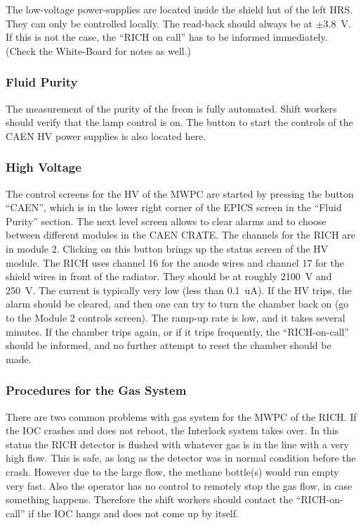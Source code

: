{The low-voltage power-supplies are located inside the shield hut of the 
left HRS. They can only be controlled locally. 
The read-back should always
be at $\pm$3.8~V. If this is not the case, the 
``RICH on call'' has to be informed immediately.
(Check the White-Board for notes as well.)

\subsubsection{Fluid Purity}

The measurement of the purity of the freon is fully automated.
Shift workers should verify that the lamp control is on.
The button to start the controls of the CAEN HV power supplies 
is also located here.

\subsubsection{High Voltage}

The control screens for the HV of the MWPC
are started by pressing the button ``CAEN'', which is 
in the lower right corner of the EPICS screen
in the ``Fluid Purity'' section. 
The next level screen allows to clear alarms and to choose between
different modules in the CAEN CRATE. The channels for the RICH are in
module 2. Clicking on this button brings up the status screen of the 
HV module. The RICH uses channel 16 for the anode wires and channel
17 for the shield wires in front of the radiator. They should be at
roughly 2100~V and 250~V. The current is typically very low (less
than 0.1~uA). If the HV trips, the alarm should be cleared,
and then one can try to turn the chamber back on (go to the 
Module 2 controls screen). The ramp-up rate is low, and it takes
several minutes. If the chamber trips again, or if it trips frequently, 
the ``RICH-on-call''
should be informed, and no further attempt to reset the chamber should
be made.

\subsubsection{Procedures for the Gas System}
\label{sec:rich_measures}

There are two common problems with gas system for the 
MWPC of the RICH. If the IOC crashes and does not reboot,
the Interlock system takes over. In this status the 
RICH detector is flushed with whatever gas is in the line
with a very high flow. This is safe, as long as the detector
was in normal condition before the crash. However due to the 
large flow, the methane bottle(s) would run empty very fast.
Also the operator has no control to remotely stop the gas flow,
in case something happens. Therefore the shift workers should 
contact the ``RICH-on-call'' if the IOC hangs and does not come 
up by itself.

}
